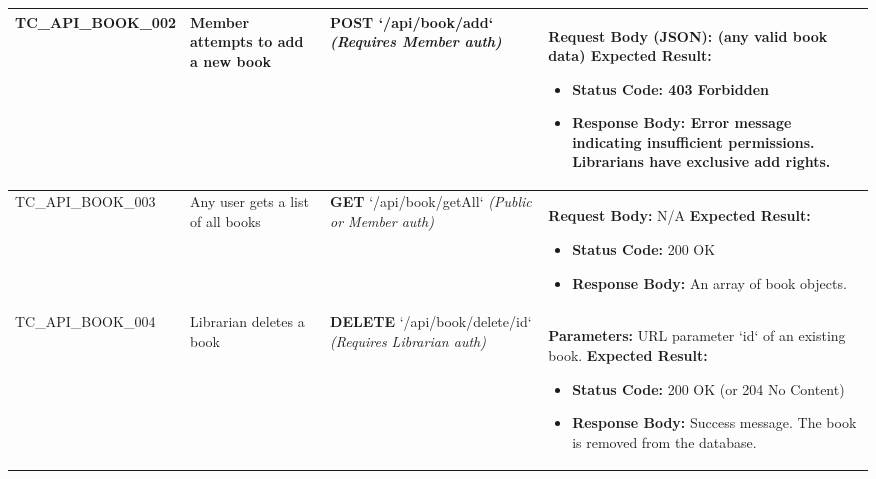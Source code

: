 \begin{longtable}{|>{\scriptsize\raggedright\arraybackslash}p{2.5cm}|>{\raggedright\arraybackslash}p{3cm}|>{\raggedright\arraybackslash}p{4cm}|>{\raggedright\arraybackslash}p{6.5cm}|}
TC\_API\_BOOK\_002 & Member attempts to add a new book & \textbf{POST} \newline `/api/book/add`  \newline \textit{(Requires Member auth)} & \textbf{Request Body (JSON):} (any valid book data) \newline
\textbf{Expected Result:}
\begin{itemize}[noitemsep, topsep=0pt, leftmargin=*]
    \item \textbf{Status Code:} 403 Forbidden
    \item \textbf{Response Body:} Error message indicating insufficient permissions. Librarians have exclusive add rights. 
\end{itemize} \\ \hline

TC\_API\_BOOK\_003 & Any user gets a list of all books & \textbf{GET} \newline `/api/book/getAll`  \newline \textit{(Public or Member auth)} & \textbf{Request Body:} N/A \newline
\textbf{Expected Result:}
\begin{itemize}[noitemsep, topsep=0pt, leftmargin=*]
    \item \textbf{Status Code:} 200 OK
    \item \textbf{Response Body:} An array of book objects. 
\end{itemize} \\ \hline

TC\_API\_BOOK\_004 & Librarian deletes a book & \textbf{DELETE} \newline `/api/book/delete/{id}`  \newline \textit{(Requires Librarian auth)} & \textbf{Parameters:} URL parameter `id` of an existing book. \newline
\textbf{Expected Result:}
\begin{itemize}[noitemsep, topsep=0pt, leftmargin=*]
    \item \textbf{Status Code:} 200 OK (or 204 No Content)
    \item \textbf{Response Body:} Success message. The book is removed from the database.
\end{itemize} \\ \hline


\end{longtable}

